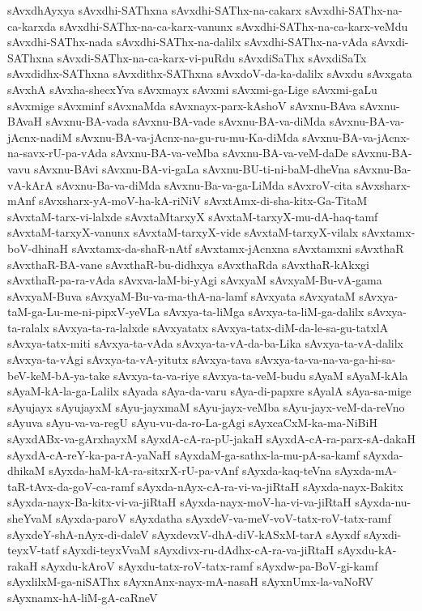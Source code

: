 {sAvxdhAyxya
sAvxdhi-SAThxna
sAvxdhi-SAThx-na-cakarx
sAvxdhi-SAThx-na-ca-karxda
sAvxdhi-SAThx-na-ca-karx-vanunx
sAvxdhi-SAThx-na-ca-karx-veMdu
sAvxdhi-SAThx-nada
sAvxdhi-SAThx-na-dalilx
sAvxdhi-SAThx-na-vAda
sAvxdi-SAThxna
sAvxdi-SAThx-na-ca-karx-vi-puRdu
sAvxdiSaThx
sAvxdiSaTx
sAvxdidhx-SAThxna
sAvxdithx-SAThxna
sAvxdoV-da-ka-dalilx
sAvxdu
sAvxgata
sAvxhA
sAvxha-shecxYva
sAvxmayx
sAvxmi
sAvxmi-ga-Lige
sAvxmi-gaLu
sAvxmige
sAvxminf
sAvxnaMda
sAvxnayx-parx-kAshoV
sAvxnu-BAva
sAvxnu-BAvaH
sAvxnu-BA-vada
sAvxnu-BA-vade
sAvxnu-BA-va-diMda
sAvxnu-BA-va-jAcnx-nadiM
sAvxnu-BA-va-jAcnx-na-gu-ru-mu-Ka-diMda
sAvxnu-BA-va-jAcnx-na-savx-rU-pa-vAda
sAvxnu-BA-va-veMba
sAvxnu-BA-va-veM-daDe
sAvxnu-BA-vavu
sAvxnu-BAvi
sAvxnu-BA-vi-gaLa
sAvxnu-BU-ti-ni-baM-dheVna
sAvxnu-Ba-vA-kArA
sAvxnu-Ba-va-diMda
sAvxnu-Ba-va-ga-LiMda
sAvxroV-cita
sAvxsharx-mAnf
sAvxsharx-yA-moV-ha-kA-riNiV
sAvxtAmx-di-sha-kitx-Ga-TitaM
sAvxtaM-tarx-vi-lalxde
sAvxtaMtarxyX
sAvxtaM-tarxyX-mu-dA-haq-tamf
sAvxtaM-tarxyX-vanunx
sAvxtaM-tarxyX-vide
sAvxtaM-tarxyX-vilalx
sAvxtamx-boV-dhinaH
sAvxtamx-da-shaR-nAtf
sAvxtamx-jAcnxna
sAvxtamxni
sAvxthaR
sAvxthaR-BA-vane
sAvxthaR-bu-didhxya
sAvxthaRda
sAvxthaR-kAkxgi
sAvxthaR-pa-ra-vAda
sAvxva-laM-bi-yAgi
sAvxyaM
sAvxyaM-Bu-vA-gama
sAvxyaM-Buva
sAvxyaM-Bu-va-ma-thA-na-lamf
sAvxyata
sAvxyataM
sAvxya-taM-ga-Lu-me-ni-pipxV-yeVLa
sAvxya-ta-liMga
sAvxya-ta-liM-ga-dalilx
sAvxya-ta-ralalx
sAvxya-ta-ra-lalxde
sAvxyatatx
sAvxya-tatx-diM-da-le-sa-gu-tatxlA
sAvxya-tatx-miti
sAvxya-ta-vAda
sAvxya-ta-vA-da-ba-Lika
sAvxya-ta-vA-dalilx
sAvxya-ta-vAgi
sAvxya-ta-vA-yitutx
sAvxya-tava
sAvxya-ta-va-na-va-ga-hi-sa-beV-keM-bA-ya-take
sAvxya-ta-va-riye
sAvxya-ta-veM-budu
sAyaM
sAyaM-kAla
sAyaM-kA-la-ga-Lalilx
sAyada
sAya-da-varu
sAya-di-papxre
sAyalA
sAya-sa-mige
sAyujayx
sAyujayxM
sAyu-jayxmaM
sAyu-jayx-veMba
sAyu-jayx-veM-da-reVno
sAyuva
sAyu-va-va-regU
sAyu-vu-da-ro-La-gAgi
sAyxcaCxM-ka-ma-NiBiH
sAyxdABx-va-gArxhayxM
sAyxdA-cA-ra-pU-jakaH
sAyxdA-cA-ra-parx-sA-dakaH
sAyxdA-cA-reY-ka-pa-rA-yaNaH
sAyxdaM-ga-sathx-la-mu-pA-sa-kamf
sAyxda-dhikaM
sAyxda-haM-kA-ra-sitxrX-rU-pa-vAnf
sAyxda-kaq-teVna
sAyxda-mA-taR-tAvx-da-goV-ca-ramf
sAyxda-nAyx-cA-ra-vi-va-jiRtaH
sAyxda-nayx-Bakitx
sAyxda-nayx-Ba-kitx-vi-va-jiRtaH
sAyxda-nayx-moV-ha-vi-va-jiRtaH
sAyxda-nu-sheYvaM
sAyxda-paroV
sAyxdatha
sAyxdeV-va-meV-voV-tatx-roV-tatx-ramf
sAyxdeY-shA-nAyx-di-daleV
sAyxdevxV-dhA-diV-kASxM-tarA
sAyxdf
sAyxdi-teyxV-tatf
sAyxdi-teyxVvaM
sAyxdivx-ru-dAdhx-cA-ra-va-jiRtaH
sAyxdu-kA-rakaH
sAyxdu-kAroV
sAyxdu-tatx-roV-tatx-ramf
sAyxdw-pa-BoV-gi-kamf
sAyxlilxM-ga-niSAThx
sAyxnAnx-nayx-mA-nasaH
sAyxnUmx-la-vaNoRV
sAyxnamx-hA-liM-gA-caRneV
}
